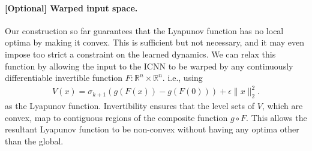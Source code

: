 \paragraph{[Optional] Warped input space. }  Our construction so far guarantees that the Lyapunov function has no local optima by making it convex. This is sufficient but not necessary, and it may even impose too strict a constraint on the learned dynamics. We can relax this function by allowing the input to the ICNN to be warped by any continuously differentiable invertible function $F : \mathbb{R}^n \times \mathbb{R}^n$. i.e., using
\begin{align}
	V(x) = \sigma_{k+1}(g(F(x)) - g(F(0))) + \epsilon \|x\|_2^2.
	\label{eq:V_definition2}
\end{align}
as the Lyapunov function.  Invertibility ensures that the level sets of $V$, which are convex, map to contiguous regions of the composite function $g \circ F$. This allows the resultant Lyapunov function to be non-convex without having any optima other than the global.

